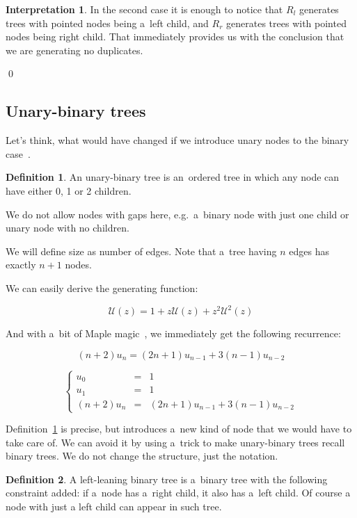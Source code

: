 \documentclass[final]{article}
\theoremstyle{definition}
\newtheorem{definition}{Definition}[subsection]
\theoremstyle{definition}
\newtheorem{interpretation}{Interpretation}[subsection]
\theoremstyle{remark}
\newcommand{\gf}[1]{\ensuremath{\mathcal{#1}}}
\begin{document}
\begin{interpretation}
In the second case it is enough to notice that \(R_l\) generates trees with pointed nodes being a~left child, and \(R_r\) generates trees with pointed nodes being right child. That immediately provides us with the conclusion that we are generating no duplicates.

\qed%
\end{interpretation}

\subsection{Unary-binary trees}%
\label{sub:unary_binary_trees}

Let's think, what would have changed if we introduce unary nodes to the binary case~\cite{motzkin}.

\begin{definition}%
    \label{def:unary_binary_tree}
    An unary-binary tree is an~ordered tree in which any node can have either 0, 1 or 2 children.
\end{definition}

We do not allow nodes with gaps here, e.g.~a~binary node with just one child or unary node with no children.

We will define size as number of edges. Note that a~tree having \(n\) edges has exactly \(n + 1\) nodes.

We can easily derive the generating function:

\[\gf{U}(z) = 1 + z\gf{U}(z) + z^2 \gf{U}^2(z)\]

And with a~bit of Maple magic~\cite{gfun}, we immediately get the following recurrence:

\[(n + 2)u_{n} = (2n + 1)u_{n - 1} + 3(n - 1)u_{n - 2}\]

\[\left\{\begin{array}{rcl}
            u_0 &=& 1\\
            u_1 &=& 1\\
            (n + 2)u_{n} &=& (2n + 1)u_{n - 1} + 3(n - 1)u_{n - 2}
\end{array}\right.\]

Definition~\ref{def:unary_binary_tree} is precise, but introduces a~new kind of node that we would have to take care of. We can avoid it by using a~trick to make unary-binary trees recall binary trees. We do not change the structure, just the notation.

\begin{definition}%
    \label{def:unary_binary_2}
    A left-leaning binary tree is a~binary tree with the following constraint added: if a~node has a~right child, it also has a~left child. Of course a node with just a left child can appear in such tree.
\end{definition}
\end{document}

